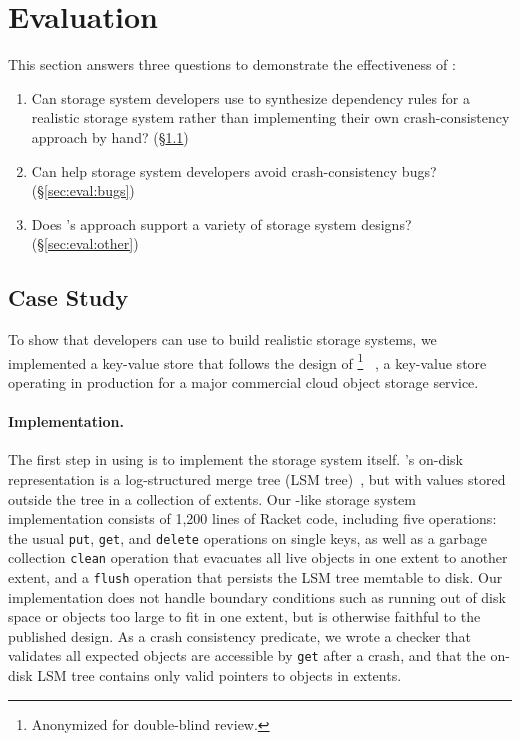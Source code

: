 \section{Evaluation}\label{sec:eval}

This section answers three questions to demonstrate the effectiveness of \depsynth:
\begin{enumerate}[left=0pt]
\item Can storage system developers use \depsynth to synthesize dependency rules for a realistic storage system
      rather than implementing their own crash-consistency approach by hand? (\S\ref{sec:eval:shardstore})
\item Can \depsynth help storage system developers avoid crash-consistency bugs? (\S\ref{sec:eval:bugs})
\item Does \depsynth's approach support a variety of storage system designs? (\S\ref{sec:eval:other})
\end{enumerate}

\subsection{\shardstore Case Study}\label{sec:eval:shardstore}

To show that developers can use \depsynth to build realistic storage systems, 
we implemented a key-value store that follows the design of \shardstore%
\footnote{Anonymized for double-blind review.}~%
\cite{bornholt:s3-anon},
a key-value store operating in production for a major commercial cloud object storage service.

\paragraph{Implementation.}
The first step in using \depsynth is to implement the storage system itself.
\shardstore's on-disk representation is a log-structured merge tree (LSM tree)~\cite{oneil:lsm},
but with values stored outside the tree in a collection of extents.
Our \shardstore-like storage system implementation
consists of 1,200 lines of Racket code, including
five operations:
the usual \texttt{put}, \texttt{get}, and \texttt{delete} operations on single keys,
as well as a garbage collection \texttt{clean} operation that 
evacuates all live objects in one extent to another extent, %
and a \texttt{flush} operation that persists the LSM tree memtable to disk.
Our implementation does not handle boundary conditions
such as running out of disk space or objects too large to fit in one extent,
but is otherwise faithful to the published \shardstore design.
As a crash consistency predicate,
we wrote a checker that validates all expected objects are accessible by \texttt{get} after a crash,
and that the on-disk LSM tree contains only valid pointers to objects in extents.

